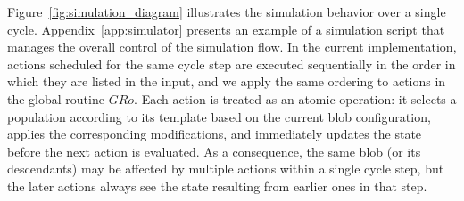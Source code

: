 \documentclass[pdflatex,sn-mathphys-num]{sn-jnl}%
\newcommand\redb[1]{#1}
\theoremstyle{thmstyleone}%
\theoremstyle{thmstyletwo}%
\theoremstyle{thmstylethree}%
\begin{document}
Figure~\ref{fig:simulation_diagram} illustrates the simulation behavior over a single cycle. Appendix~\ref{app:simulator} presents an example of a simulation script that manages the overall control of the simulation flow. \redb{In the current implementation, actions scheduled for the same cycle step are executed sequentially in the order in which they are listed in the input, and we apply the same ordering to actions in the global routine $GRo$. 
Each action is treated as an atomic operation: it selects a population according to its template based on the current blob configuration, applies the corresponding modifications, and immediately updates the state before the next action is evaluated. As a consequence, the same blob (or its descendants) may be affected by multiple actions within a single cycle step, but the later actions always see the state resulting from earlier ones in that step.}



\end{document}

